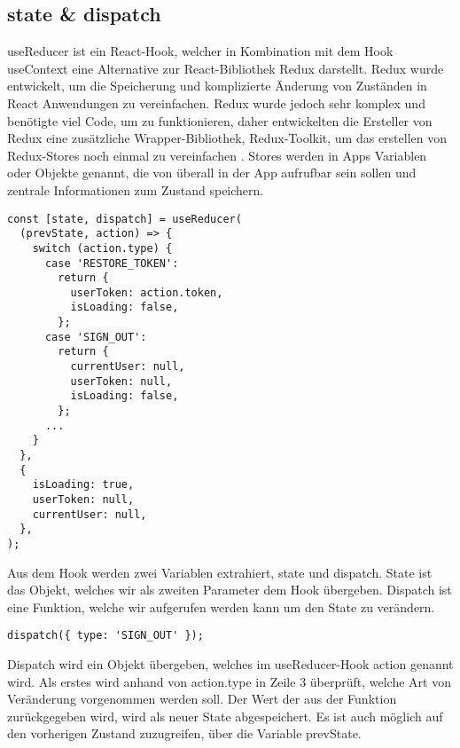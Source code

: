 \subsection{state \& dispatch}
useReducer ist ein React-Hook, welcher in Kombination mit dem Hook useContext eine Alternative zur
React-Bibliothek Redux darstellt. Redux wurde entwickelt, um die Speicherung und komplizierte
Änderung von Zuständen in React Anwendungen zu vereinfachen. Redux wurde jedoch sehr komplex und
benötigte viel Code, um zu funktionieren, daher entwickelten die Ersteller von Redux eine
zusätzliche Wrapper-Bibliothek, Redux-Toolkit, um das erstellen von Redux-Stores noch einmal zu
vereinfachen \cite{reduxToolkit}. Stores werden in Apps Variablen oder Objekte genannt, die von
überall in der App aufrufbar sein sollen und zentrale Informationen zum Zustand speichern.

\begin{lstlisting}
const [state, dispatch] = useReducer(
  (prevState, action) => {
    switch (action.type) {
      case 'RESTORE_TOKEN':
        return {
          userToken: action.token,
          isLoading: false,
        };
      case 'SIGN_OUT':
        return {
          currentUser: null,
          userToken: null,
          isLoading: false,
        };
      ...
    }
  },
  {
    isLoading: true,
    userToken: null,
    currentUser: null,
  },
);
\end{lstlisting}

Aus dem Hook werden zwei Variablen extrahiert, state und dispatch. State ist das Objekt, welches wir
als zweiten Parameter dem Hook übergeben. Dispatch ist eine Funktion, welche wir aufgerufen werden
kann um den State zu verändern.

\begin{lstlisting}
dispatch({ type: 'SIGN_OUT' });
\end{lstlisting}

Dispatch wird ein Objekt übergeben, welches im useReducer-Hook action genannt wird. Als erstes wird
anhand von action.type in Zeile 3 überprüft, welche Art von Veränderung vorgenommen werden soll.
Der Wert der aus der Funktion zurückgegeben wird, wird als neuer State abgespeichert. Es ist auch
möglich auf den vorherigen Zustand zuzugreifen, über die Variable prevState.
